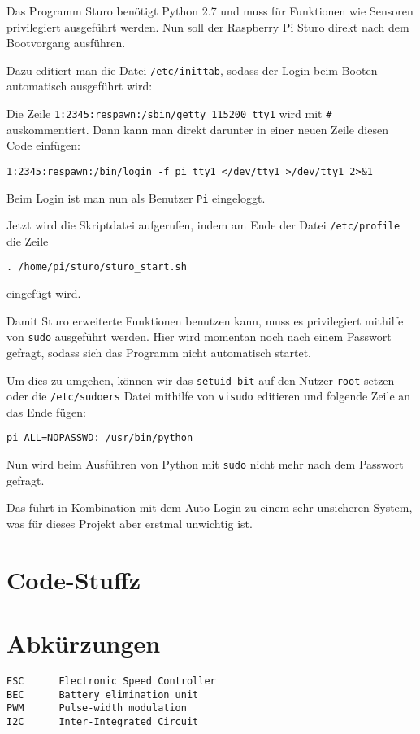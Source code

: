 \documentclass[a4paper,10pt]{scrartcl}
\begin{document}
    Das Programm Sturo benötigt Python 2.7 und muss für Funktionen wie Sensoren privilegiert
    ausgeführt werden.
    Nun soll der Raspberry Pi Sturo direkt nach dem Bootvorgang ausführen.

    Dazu editiert man die Datei \lstinline{/etc/inittab}, sodass der Login beim Booten automatisch
    ausgeführt wird:

    Die Zeile \lstinline{1:2345:respawn:/sbin/getty 115200 tty1} wird mit \lstinline{#}
    auskommentiert.
    Dann kann man direkt darunter in einer neuen Zeile diesen Code einfügen:
    \begin{lstlisting}
1:2345:respawn:/bin/login -f pi tty1 </dev/tty1 >/dev/tty1 2>&1
    \end{lstlisting}
    Beim Login ist man nun als Benutzer \lstinline{Pi} eingeloggt.\cite{opentech}

    Jetzt wird die Skriptdatei aufgerufen, indem am Ende der Datei \lstinline{/etc/profile} die
    Zeile
    \begin{lstlisting}
. /home/pi/sturo/sturo_start.sh
    \end{lstlisting}
    eingefügt wird.

    Damit Sturo erweiterte Funktionen benutzen kann, muss es privilegiert mithilfe von
    \lstinline{sudo} ausgeführt werden.
    Hier wird momentan noch nach einem Passwort gefragt, sodass sich das Programm nicht automatisch
    startet.

    Um dies zu umgehen, können wir das \lstinline{setuid bit} auf den Nutzer \lstinline{root} setzen
    oder die \lstinline{/etc/sudoers} Datei mithilfe von \lstinline{visudo} editieren und folgende
    Zeile an das Ende fügen:
    \begin{lstlisting}
pi ALL=NOPASSWD: /usr/bin/python
    \end{lstlisting}

    Nun wird beim Ausführen von Python mit \lstinline{sudo} nicht mehr nach dem Passwort gefragt.

    Das führt in Kombination mit dem Auto-Login zu einem sehr unsicheren System, was für dieses
    Projekt aber erstmal unwichtig ist.

  \section{Code-Stuffz}

  \section{Abkürzungen}
    \begin{lstlisting}
ESC      Electronic Speed Controller
BEC      Battery elimination unit
PWM      Pulse-width modulation
I2C      Inter-Integrated Circuit
    \end{lstlisting}
\end{document}

